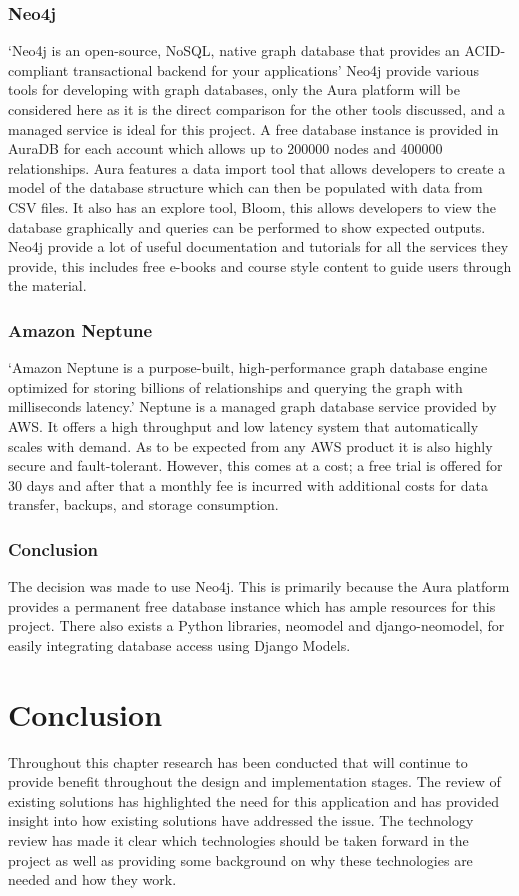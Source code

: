 \subsubsection*{Neo4j}
`Neo4j is an open-source, NoSQL, native graph database that provides an ACID-compliant transactional backend for your 
applications'\cite{WhatGraphDatabasea} Neo4j provide various tools for developing with graph databases, only the Aura 
platform will be considered here as it is the direct comparison for the other tools discussed, and a managed service is 
ideal for this project. A free database instance is provided in AuraDB for each account which allows up to 200000 nodes
 and 400000 relationships. Aura features a data import tool that allows developers to create a model of the database 
structure which can then be populated with data from CSV files. It also has an explore tool, Bloom, this allows 
developers to view the database graphically and queries can be performed to show expected outputs. Neo4j provide a lot 
of useful documentation and tutorials for all the services they provide, this includes free e-books and course style 
content to guide users through the material.
\subsubsection*{Amazon Neptune}
`Amazon Neptune is a purpose-built, high-performance graph database engine optimized for storing billions of 
relationships and querying the graph with milliseconds latency.'\cite{WhatGraphDatabase} Neptune is a managed graph 
database service provided by AWS. It offers a high throughput and low latency system that automatically scales with 
demand. As to be expected from any AWS product it is also highly secure and fault-tolerant. However, this comes at a 
cost; a free trial is offered for 30 days and after that a monthly fee is incurred with additional costs for data 
transfer, backups, and storage consumption.
\subsubsection*{Conclusion}
The decision was made to use Neo4j. This is primarily because the Aura platform provides a permanent free database 
instance which has ample resources for this project. There also exists a Python libraries, neomodel and django-neomodel,
 for easily integrating database access using Django Models. 
\section{Conclusion}
Throughout this chapter research has been conducted that will continue to provide benefit throughout the design and 
implementation stages. The review of existing solutions has highlighted the need for this application and has provided 
insight into how existing solutions have addressed the issue. The technology review has made it clear which technologies
 should be taken forward in the project as well as providing some background on why these technologies are needed and 
how they work.